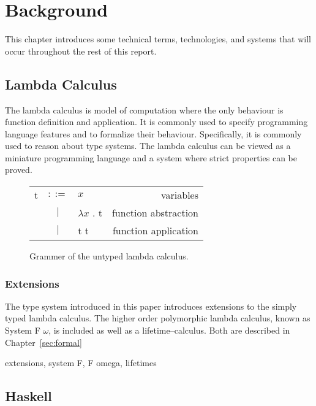 \chapter{Background}\label{sec:background}
This chapter introduces some technical terms, technologies, and systems that
will occur throughout the rest of this report.

\section{Lambda Calculus}\label{sec:lambda-calc}
The lambda calculus is model of computation where the only behaviour is
function definition and application. It is commonly used to specify programming
language features and to formalize their behaviour. Specifically, it is
commonly used to reason about type systems. The lambda calculus can be viewed
as a miniature programming language and a system where strict properties can
be proved.

\begin{figure}[H]\label{fig:lambda-calc}
    \centering
    \begin{tabular}{l c p{3cm} r}
        t & $ ::= $ & $ x $ &                   variables \\
      & $ | $ & $ \lambda x $ . t &          function abstraction \\
      & $ | $ & t t &          function application \\
    \end{tabular}
    \caption{Grammer of the untyped lambda calculus.}
\end{figure}

\subsection{Extensions}

The type system introduced in this paper introduces extensions to the simply
typed lambda calculus. The higher order polymorphic lambda calculus, known as
System F $\omega$, is included as well as a lifetime--calculus. Both are
described in Chapter~\ref{sec:formal}

extensions, system F, F omega, lifetimes

\section{Haskell}
